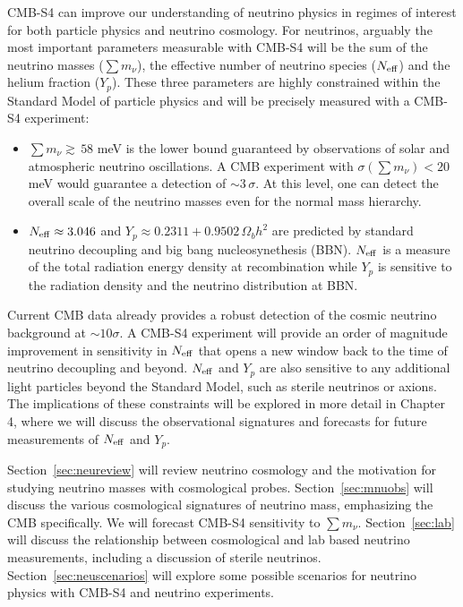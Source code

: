 CMB-S4 can improve our understanding of neutrino physics in regimes of interest for both particle physics and neutrino cosmology.  For neutrinos, arguably the most important parameters measurable with CMB-S4 will be the sum of the neutrino masses ($\sum m_\nu$), the effective number of neutrino species ($N_{\rm eff}$) and the helium fraction ($Y_p$).  These three parameters are highly constrained within the Standard Model of particle physics and will be precisely measured with a CMB-S4 experiment:
\begin{itemize}
\item $ \sum m_\nu \gtrsim \, 58$ meV is the lower bound guaranteed by observations of solar and atmospheric neutrino oscillations.  A CMB experiment with $\sigma(\sum m_\nu) < 20$ meV would guarantee a detection of $\sim3\,\sigma$.  At this level, one can detect the overall scale of the neutrino masses even for the normal mass hierarchy.
\item $N_{\rm eff} \approx  3.046$ and $Y_p \approx 0.2311 + 0.9502 \, \Omega_b h^2$ are predicted by standard neutrino decoupling and big bang nucleosynethesis (BBN).  $N_{\rm eff}$ is a measure of the total radiation energy density at recombination while $Y_p$ is sensitive to the radiation density and the neutrino distribution at BBN. 
\end{itemize}
Current CMB data already provides a robust detection of the cosmic neutrino background at $\sim10 \sigma$.  A CMB-S4 experiment will provide an order of magnitude improvement in sensitivity in $N_{\rm eff}$ that opens a new window back to the time of neutrino decoupling and beyond.  $N_{\rm eff}$ and $Y_p$ are also sensitive to any additional light particles beyond the Standard Model, such as sterile neutrinos or axions.  The implications of these constraints will be explored in more detail in Chapter 4, where we will discuss the observational signatures and forecasts for future measurements of $N_{\rm eff}$ and $Y_p$.  

Section~\ref{sec:neureview} will review neutrino cosmology and the motivation for studying neutrino masses with cosmological probes.  Section~\ref{sec:mnuobs} will discuss the various cosmological signatures of neutrino mass, emphasizing the CMB specifically.  We will forecast CMB-S4 sensitivity to $\sum m_\nu$.  Section~\ref{sec:lab} will discuss the relationship between cosmological and lab based neutrino measurements, including a discussion of sterile neutrinos.  Section~\ref{sec:neuscenarios} will explore some possible scenarios for neutrino physics with CMB-S4 and neutrino experiments.


